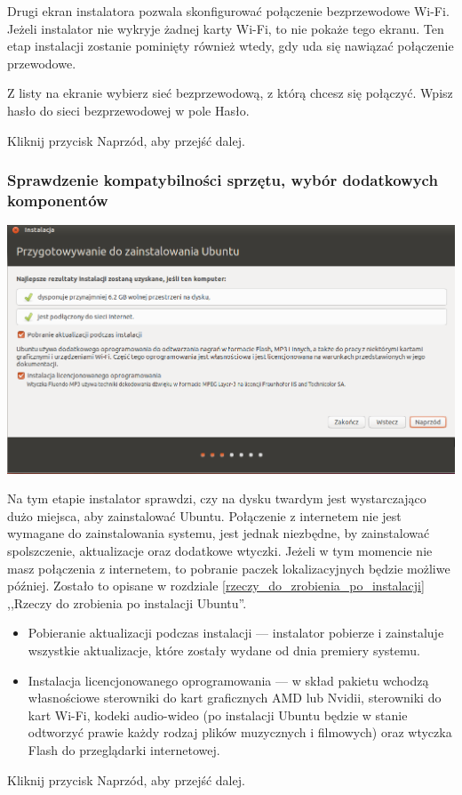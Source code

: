 Drugi ekran instalatora pozwala skonfigurować połączenie bezprzewodowe Wi-Fi. Jeżeli instalator nie wykryje żadnej karty Wi-Fi, to nie pokaże tego ekranu. Ten etap instalacji zostanie pominięty również wtedy, gdy uda się nawiązać połączenie przewodowe.

Z listy na ekranie wybierz sieć bezprzewodową, z którą chcesz się połączyć. Wpisz hasło do sieci bezprzewodowej w pole \textcolor{ubuntu_orange}{Hasło}.
\begin{flushright}
Kliknij przycisk \textcolor{ubuntu_orange}{Naprzód}, aby przejść dalej.
\end{flushright}
\clearpage
\subsubsection{Sprawdzenie kompatybilności sprzętu, wybór dodatkowych komponentów}
\begin{center}
        \includegraphics[width=\linewidth]{images/instalator_wymagania.png}
\end{center}

Na tym etapie instalator sprawdzi, czy na dysku twardym jest wystarczająco dużo miejsca, aby zainstalować Ubuntu. Połączenie z internetem nie jest wymagane do zainstalowania systemu, jest jednak niezbędne, by zainstalować spolszczenie, aktualizacje oraz dodatkowe wtyczki. Jeżeli w tym momencie nie masz połączenia z internetem, to pobranie paczek lokalizacyjnych będzie możliwe później. Zostało to opisane w rozdziale \ref{rzeczy_do_zrobienia_po_instalacji} ,,Rzeczy do zrobienia po instalacji Ubuntu''.
\begin{itemize}
\item \textcolor{ubuntu_orange}{Pobieranie aktualizacji podczas instalacji} --- instalator pobierze i zainstaluje wszystkie aktualizacje, które zostały wydane od dnia premiery systemu.
\item \textcolor{ubuntu_orange}{Instalacja licencjonowanego oprogramowania} --- w skład pakietu wchodzą własnościowe sterowniki do kart graficznych AMD lub Nvidii, sterowniki do kart Wi-Fi, kodeki audio-wideo (po instalacji Ubuntu będzie w stanie odtworzyć prawie każdy rodzaj plików muzycznych i filmowych) oraz wtyczka Flash do przeglądarki internetowej.
\end{itemize}
\begin{flushright}
Kliknij przycisk \textcolor{ubuntu_orange}{Naprzód}, aby przejść dalej.
\end{flushright}
\clearpage
